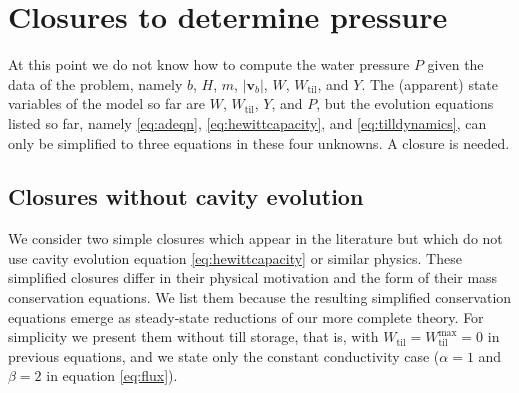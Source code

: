 \documentclass[11pt,final]{amsart}
\newcommand\bv{\mathbf{v}}
\newcommand{\Wtil}{W_{\text{til}}}
\newcommand{\Wtilmax}{W_{\text{til}}^{\text{max}}}
\begin{document}
\section{Closures to determine pressure} \label{sec:closures}

At this point we do not know how to compute the water pressure $P$ given the data of the problem, namely $b$, $H$, $m$, $|\bv_b|$, $W$, $\Wtil$, and $Y$.  The (apparent) state variables of the model so far are $W$, $\Wtil$, $Y$, and $P$, but the evolution equations listed so far, namely \eqref{eq:adeqn}, \eqref{eq:hewittcapacity}, and \eqref{eq:tilldynamics}, can only be simplified to three equations in these four unknowns.   A closure is needed.

\subsection*{Closures without cavity evolution}  We consider two simple closures which appear in the literature but which do not use cavity evolution equation \eqref{eq:hewittcapacity} or similar physics.  These simplified closures differ in their physical motivation and the form of their mass conservation equations.  We list them because the resulting simplified conservation equations emerge as steady-state reductions of our more complete theory.  For simplicity we present them without till storage, that is, with $\Wtil=\Wtilmax=0$ in previous equations, and we state only the constant conductivity case ($\alpha=1$ and $\beta=2$ in equation \eqref{eq:flux}).
\end{document}
